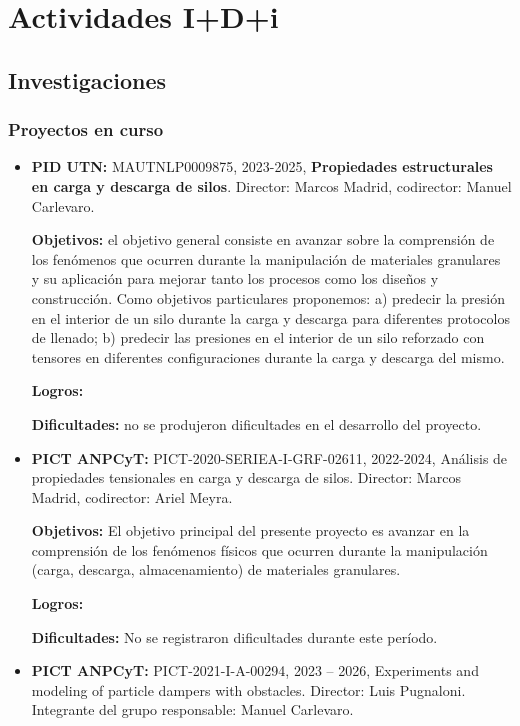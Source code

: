 \documentclass[a4paper,11pt,twoside,final,titlepage,onecolumn,openright]{report}
\begin{document}
\chapter{Actividades I+D+i}

\section{Investigaciones}

\subsection{Proyectos en curso}

\begin{itemize}
  
\item {\bf PID UTN:} MAUTNLP0009875, 2023-2025, {\bf Propiedades estructurales en carga y descarga de silos}. Director: Marcos Madrid, codirector: Manuel Carlevaro.
 
{\bf Objetivos:} el objetivo general consiste en avanzar sobre la comprensión de los fenómenos que ocurren durante la manipulación de materiales granulares y su aplicación para mejorar tanto los procesos como los diseños y construcción. Como objetivos particulares proponemos: a) predecir la presión en el interior de un silo durante la carga y descarga para diferentes protocolos de llenado; b) predecir las presiones en el interior de un silo reforzado con tensores en diferentes configuraciones durante la carga y descarga del mismo.

{\bf Logros:}  
 
 {\bf Dificultades:} no se produjeron dificultades en el desarrollo del proyecto. 


\item \textbf{PICT ANPCyT:} PICT-2020-SERIEA-I-GRF-02611, 2022-2024, Análisis de propiedades tensionales en carga y descarga de silos. Director: Marcos Madrid, codirector: Ariel Meyra.

    \textbf{Objetivos:} El objetivo principal del presente proyecto es avanzar en la comprensión de los fenómenos físicos que ocurren durante la manipulación (carga, descarga, almacenamiento) de materiales granulares. 

    \textbf{Logros:}  


    \textbf{Dificultades:} No se registraron dificultades durante este período.


\item \textbf{PICT ANPCyT:} PICT-2021-I-A-00294, 2023 -- 2026, Experiments and modeling of particle dampers with obstacles. Director: Luis Pugnaloni. Integrante del grupo responsable: Manuel Carlevaro.


\end{itemize}
\end{document}
